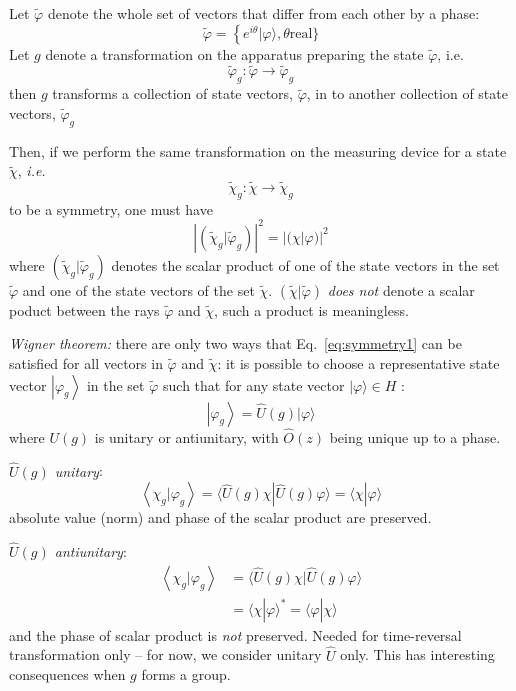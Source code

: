 \documentclass[12pt]{article}
\newcommand{\be}{\begin{equation}}
\newcommand{\ee}{\end{equation}}
\begin{document}
Let \(\widetilde{\varphi}\) denote the whole set of vectors that
differ from each other by a phase:
\be
\widetilde{\varphi}=\left\{e^{i \theta}|\varphi\rangle, \theta\right. \text{real} \}
\ee
Let $g$ denote a transformation on the apparatus
preparing the state \(\widetilde\varphi\), i.e.
\be
\widetilde{\varphi}_{g}: \widetilde{\varphi} \rightarrow \widetilde{\varphi}_{g}
\ee
then
$g$ transforms a collection of state vectors, \(\widetilde{\varphi}\),
in to another collection of state vectors, \(\widetilde{\varphi}_{g}\)

Then, if we perform the same transformation on
the measuring device for a state \(\widetilde{\chi}\), \textit{i.e.}
\be
\widetilde{\chi}_{g}: \widetilde{\chi} \rightarrow \widetilde{\chi}_{g}
\ee
to be a symmetry, one must have
\be
\left|(\widetilde{\chi}_{g} | \widetilde{\varphi}_{g})\right|^{2}=|(\chi | \varphi)|^{2}
\label{eq:symmetry1}
\ee
where \((\widetilde{\chi}_{g}|\widetilde{\varphi}_{g})\) 
denotes the scalar product of
one of the state vectors in the set \(\widetilde{\varphi}\) and one
of the state vectors of the set \(\widetilde{\chi}\).
\((\widetilde{\chi} | \widetilde{\varphi})\) 
\emph{does not} denote a scalar poduct
between the rays \(\widetilde{\varphi}\) and \(\widetilde{\chi}\), such a product
is meaningless.

\emph{Wigner theorem:}
there are only two ways that
Eq.~\eqref{eq:symmetry1} can be satisfied for
all vectors in \(\widetilde{\varphi}\) and \(\widetilde{\chi}\):
it is possible to choose a representative state
vector \(\left|\varphi_{g}\right\rangle\) in the set \(\widetilde{\varphi}\) such that for any
state vector \(|\varphi\rangle \in H\) :
\be
\left|\varphi_{g}\right\rangle=\hat{U}(g)|\varphi\rangle
\ee
where \(U(g)\) is unitary or antiunitary, with
\(\hat{O}(z)\) being unique up to a phase.

\emph{$\hat{U}(g)$ unitary}:
\be
\left\langle \chi_{g} | \varphi_{g}\right\rangle=\langle\hat{U}(g) \chi | \hat{U}(g) \varphi\rangle=\langle \chi | \varphi\rangle
\ee
absolute value (norm) and phase
of the scalar product are preserved.

\emph{$\hat{U}(g)$ antiunitary}:
\be
\begin{aligned}
\left\langle \chi_{g} | \varphi_{g}\right\rangle 
&=\langle\hat{U}(g) \chi | \hat{U}(g) \varphi\rangle \\ 
&=\langle \chi | \varphi\rangle^{*}=\langle\varphi | \chi\rangle 
\end{aligned}
\ee
and the phase of scalar product is \emph{not} preserved.
Needed for time-reversal transformation only
-- for now, we consider unitary \(\hat{U}\) only.
This has interesting consequences when $g$ forms a group.
\end{document}
